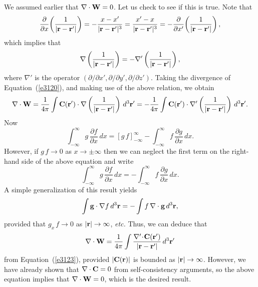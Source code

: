 We assumed earlier that $\nabla\cdot {\bf W} = 0$. Let us check to
see if this is true. Note that
\begin{equation}\label{e3121}
\frac{\partial}{\partial x}\! \left(\frac{1}{|{\bf r} - {\bf r}'|}\right) = 
-\frac{x-x'}{|{\bf r} - {\bf r}'|^3} = \frac{x'-x}{|{\bf r} - {\bf r}'|^3}
= -\frac{\partial}{\partial x'} \!\left(\frac{1}{|{\bf r} - {\bf r}'|}\right),
\end{equation}
which implies that
\begin{equation}\label{e2.145h}
\nabla\left( \frac{1}{|{\bf r} - {\bf r}'|}\right) = - \nabla'
 \left( \frac{1}{|{\bf r} - {\bf r}'|}\right),
\end{equation}
where $\nabla'$ is the operator $(\partial/\partial x', \partial/\partial y',
\partial/\partial z')$. Taking the divergence of Equation~(\ref{e3120}), and making use of
the above relation, we obtain
\begin{equation}
\nabla\cdot{\bf W} = \frac{1}{4\pi} \int {\bf C}({\bf r'})\cdot
\nabla\left( \frac{1}{|{\bf r} - {\bf r}'|}\right)\,d^3{\bf r}'
= -  \frac{1}{4\pi} \int {\bf C}({\bf r'})\cdot
\nabla'\left( \frac{1}{|{\bf r} - {\bf r}'|}\right)\,d^3{\bf r}'.\label{e3123}
\end{equation}
Now
\begin{equation}
\int_{-\infty}^{\infty} g \,\frac{\partial f}{\partial x}\,dx = \left[
g\,f\right]_{-\infty}^{\infty} - \int_{-\infty}^{\infty}
 f\,\frac{\partial g}{\partial x}\,dx.
\end{equation}
However, if $g\,f\rightarrow 0$ as $x\rightarrow\pm\infty$ then we can neglect the
first term on the right-hand side of the above equation and write
\begin{equation}
\int_{-\infty}^{\infty} g\, \frac{\partial f}{\partial x}\,dx = -
\int_{-\infty}^{\infty} f\, \frac{\partial g}{\partial x}\,dx.
\end{equation}
A simple generalization of this result yields
\begin{equation}\label{e2.152x}
\int {\bf g}\cdot\nabla f\,d^3{\bf r} = - \int f\,\nabla\cdot {\bf g}\,d^3{\bf r},
\end{equation}
provided that $g_x\,f \rightarrow 0$ as $|{\bf r}|\rightarrow\infty$, {\em etc.}
Thus, we can
deduce that
\begin{equation}\label{e3127}
\nabla\cdot{\bf W} = \frac{1}{4\pi}\int \frac{\nabla'\!\cdot\!{\bf C}({\bf r}') }
{|{\bf r} - {\bf r}'|} \,d^3{\bf r'}
\end{equation}
from Equation~(\ref{e3123}), provided  $|{\bf C}({\bf r})|$ is bounded as
 $|{\bf r}|\rightarrow\infty$. However, we have already shown that
$\nabla\cdot {\bf C} = 0$ from self-consistency arguments, so the above equation
 implies that $\nabla\cdot{\bf W} = 0$, which is the desired result.

